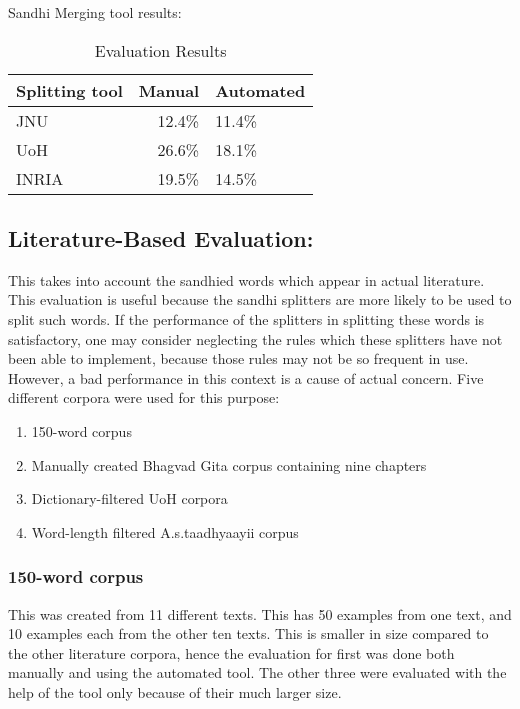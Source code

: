 \documentclass[11pt]{article}
\begin{document}
Sandhi Merging tool results:

\begin{table}[h]
\begin{center}
\begin{tabular}{|l|rl|}
\hline \bf Splitting tool & \bf Manual \bf & Automated \\ \hline
JNU&12.4\%&11.4\% \\
UoH&26.6\%&18.1\% \\
INRIA&19.5\%&14.5\% \\
\hline
\end{tabular}
\end{center}
\caption{\label{font-table} Evaluation Results }
\end{table}

\subsection{Literature-Based Evaluation:}
\label{ssec:litSurvey}

This takes into account the sandhied words which appear in actual literature. This evaluation is useful because the sandhi splitters are more likely to be used to split such words. If the performance of the splitters in splitting these words is satisfactory, one may consider neglecting the rules which these splitters have not been able to implement, because those rules may not be so frequent in use. However, a bad performance in this context is a cause of actual concern. 
Five different corpora were used for this purpose:
\begin{enumerate}
\item 150-word corpus
\item  Manually created Bhagvad Gita corpus containing nine chapters
\item  Dictionary-filtered UoH corpora
\item  Word-length filtered A.s.taadhyaayii corpus
\end{enumerate}

\subsubsection{150-word corpus}

This was created from 11 different texts. This has 50 examples from one text, and 10 examples each from the other ten texts. This is smaller in size compared to the other literature corpora, hence the evaluation for first was done both manually and using the automated tool. The other three were evaluated with the help of the tool only because of their much larger size.
\end{document}
